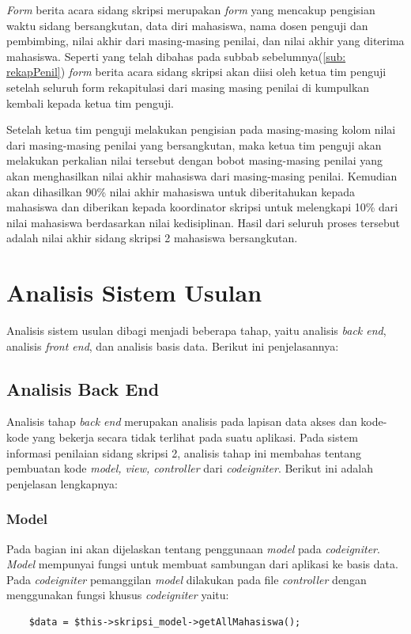 	\textit{Form} berita acara sidang skripsi merupakan \textit{form} yang mencakup pengisian waktu sidang bersangkutan, data diri mahasiswa, nama dosen penguji dan pembimbing, nilai akhir dari masing-masing penilai, dan nilai akhir yang diterima mahasiswa. Seperti yang telah dibahas pada subbab sebelumnya(\ref{sub: rekapPenil}) \textit{form} berita acara sidang skripsi akan diisi oleh ketua tim penguji setelah seluruh form rekapitulasi dari masing masing penilai di kumpulkan kembali kepada ketua tim penguji.
	
	Setelah ketua tim penguji melakukan pengisian pada masing-masing kolom nilai dari masing-masing penilai yang bersangkutan, maka ketua tim penguji akan melakukan perkalian nilai tersebut dengan bobot masing-masing penilai yang akan menghasilkan nilai akhir mahasiswa dari masing-masing penilai. Kemudian akan dihasilkan 90\% nilai akhir mahasiswa untuk diberitahukan kepada mahasiswa dan diberikan kepada koordinator skripsi untuk melengkapi 10\% dari nilai mahasiswa berdasarkan nilai kedisiplinan. Hasil dari seluruh proses tersebut adalah nilai akhir sidang skripsi 2 mahasiswa bersangkutan.
	
\section{Analisis Sistem Usulan}
\label{sec: analisisSUsulan}

Analisis sistem usulan dibagi menjadi beberapa tahap, yaitu analisis \textit{back end}, analisis \textit{front end}, dan analisis basis data. Berikut ini penjelasannya:
	
	\subsection{Analisis Back End}
	\label{sub: backEnd}
	
	Analisis tahap \textit{back end} merupakan analisis pada lapisan data akses dan kode-kode yang bekerja secara tidak terlihat pada suatu aplikasi. Pada sistem informasi penilaian sidang skripsi 2, analisis tahap ini membahas tentang pembuatan kode \textit{model, view, controller} dari \textit{codeigniter}. Berikut ini adalah penjelasan lengkapnya:
	
	\subsubsection{Model}
	\label{subsub: modelCI}
	
	Pada bagian ini akan dijelaskan tentang penggunaan \textit{model} pada \textit{codeigniter}. \textit{Model} mempunyai fungsi untuk membuat sambungan dari aplikasi ke basis data. Pada \textit{codeigniter} pemanggilan \textit{model} dilakukan pada file \textit{controller} dengan menggunakan fungsi khusus \textit{codeigniter} yaitu:
	\begin{lstlisting}
	$data = $this->skripsi_model->getAllMahasiswa();
	\end{lstlisting}
	
